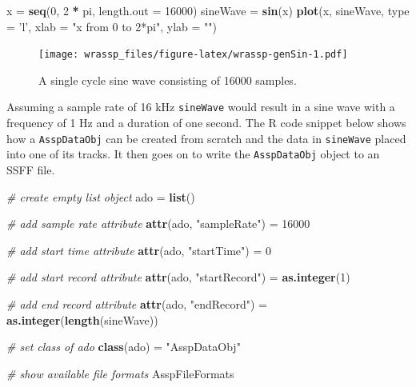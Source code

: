 \documentclass[]{book}
\newenvironment{Shaded}{\begin{snugshade}}{\end{snugshade}}
\newcommand{\CommentTok}[1]{\textcolor[rgb]{0.56,0.35,0.01}{\textit{#1}}}
\newcommand{\DataTypeTok}[1]{\textcolor[rgb]{0.13,0.29,0.53}{#1}}
\newcommand{\DecValTok}[1]{\textcolor[rgb]{0.00,0.00,0.81}{#1}}
\newcommand{\KeywordTok}[1]{\textcolor[rgb]{0.13,0.29,0.53}{\textbf{#1}}}
\newcommand{\NormalTok}[1]{#1}
\newcommand{\OperatorTok}[1]{\textcolor[rgb]{0.81,0.36,0.00}{\textbf{#1}}}
\newcommand{\StringTok}[1]{\textcolor[rgb]{0.31,0.60,0.02}{#1}}
\begin{document}
\begin{Shaded}
\begin{Highlighting}[]
\NormalTok{x =}\StringTok{ }\KeywordTok{seq}\NormalTok{(}\DecValTok{0}\NormalTok{, }\DecValTok{2} \OperatorTok{*}\StringTok{ }\NormalTok{pi, }\DataTypeTok{length.out =} \DecValTok{16000}\NormalTok{)}
\NormalTok{sineWave =}\StringTok{ }\KeywordTok{sin}\NormalTok{(x)}
\KeywordTok{plot}\NormalTok{(x, sineWave, }\DataTypeTok{type =} \StringTok{'l'}\NormalTok{,}
     \DataTypeTok{xlab =} \StringTok{"x from 0 to 2*pi"}\NormalTok{,}
     \DataTypeTok{ylab =} \StringTok{""}\NormalTok{)}
\end{Highlighting}
\end{Shaded}

\begin{figure}
\centering
\texttt{[image: wrassp\_files/figure-latex/wrassp-genSin-1.pdf]}
\caption{\label{fig:wrassp-genSin}A single cycle sine wave consisting of 16000 samples.}
\end{figure}

Assuming a sample rate of 16 kHz \texttt{sineWave} would result in a sine wave with a frequency of 1 Hz and a duration of one second. The R code snippet below shows how a \texttt{AsspDataObj} can be created from scratch and the data in \texttt{sineWave} placed into one of its tracks. It then goes on to write the \texttt{AsspDataObj} object to an SSFF file.

\begin{Shaded}
\begin{Highlighting}[]
\CommentTok{# create empty list object}
\NormalTok{ado =}\StringTok{ }\KeywordTok{list}\NormalTok{()}

\CommentTok{# add sample rate attribute}
\KeywordTok{attr}\NormalTok{(ado, }\StringTok{"sampleRate"}\NormalTok{) =}\StringTok{ }\DecValTok{16000}

\CommentTok{# add start time attribute}
\KeywordTok{attr}\NormalTok{(ado, }\StringTok{"startTime"}\NormalTok{) =}\StringTok{ }\DecValTok{0}

\CommentTok{# add start record attribute}
\KeywordTok{attr}\NormalTok{(ado, }\StringTok{"startRecord"}\NormalTok{) =}\StringTok{ }\KeywordTok{as.integer}\NormalTok{(}\DecValTok{1}\NormalTok{)}

\CommentTok{# add end record attribute}
\KeywordTok{attr}\NormalTok{(ado, }\StringTok{"endRecord"}\NormalTok{) =}\StringTok{ }\KeywordTok{as.integer}\NormalTok{(}\KeywordTok{length}\NormalTok{(sineWave))}

\CommentTok{# set class of ado}
\KeywordTok{class}\NormalTok{(ado) =}\StringTok{ "AsspDataObj"}

\CommentTok{# show available file formats}
\NormalTok{AsspFileFormats}
\end{Highlighting}
\end{Shaded}
\end{document}
